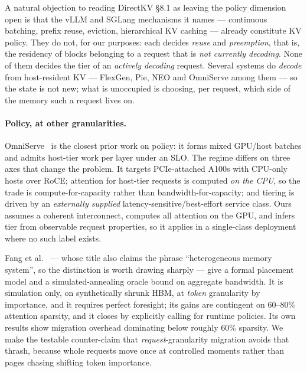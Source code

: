 A natural objection to reading DirectKV \S8.1 as leaving the policy dimension
open is that the vLLM and SGLang mechanisms it names --- continuous batching,
prefix reuse, eviction, hierarchical KV caching --- already constitute KV
policy. They do not, for our purposes: each decides \emph{reuse} and
\emph{preemption}, that is, the residency of blocks belonging to a request that
is \emph{not currently decoding}. None of them decides the tier of an
\emph{actively decoding} request. Several systems do \emph{decode} from
host-resident KV --- FlexGen, Pie, NEO and OmniServe among them --- so the state
is not new; what is unoccupied is choosing, per request, which side of the
memory such a request lives on.

\paragraph{Policy, at other granularities.} OmniServe~\cite{omniserve} is the
closest prior work on policy: it forms mixed GPU/host batches and admits
host-tier work per layer under an SLO. The regime differs on three axes that
change the problem. It targets PCIe-attached A100s with CPU-only hosts over
RoCE; attention for host-tier requests is computed \emph{on the CPU}, so the
trade is compute-for-capacity rather than bandwidth-for-capacity; and tiering
is driven by an \emph{externally supplied} latency-sensitive/best-effort
service class. Ours assumes a coherent interconnect, computes all attention on
the GPU, and infers tier from observable request properties, so it applies in a
single-class deployment where no such label exists.

Fang et al.~\cite{calkv} --- whose title also claims the phrase ``heterogeneous
memory system'', so the distinction is worth drawing sharply --- give a formal
placement model and a
simulated-annealing oracle bound on aggregate bandwidth. It is simulation only,
on synthetically shrunk HBM, at \emph{token} granularity by importance, and it
requires perfect foresight; its gains are contingent on 60--80\% attention
sparsity, and it closes by explicitly calling for runtime policies. Its own
results show migration overhead dominating below roughly 60\% sparsity. We
make the testable counter-claim that \emph{request}-granularity migration
avoids that thrash, because whole requests move once at controlled moments
rather than pages chasing shifting token importance.

